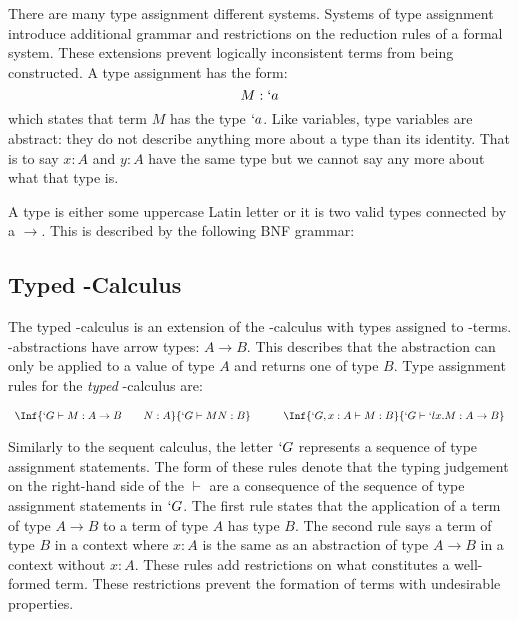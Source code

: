   There are many type assignment different systems.
  Systems of type assignment introduce additional grammar and restrictions on the reduction rules of a formal system. 
  These extensions prevent logically inconsistent terms from being constructed. 
  A type assignment has the form:
  \[
    M : `a 
  \]
  which states that term $M$ has the type $`a$. 
  Like variables, type variables are abstract: 
  they do not describe anything more about a type than its identity. 
  That is to say $x: A$ and $y : A$ have the same type but we cannot say any more about what that type is.
 
  A type is either some uppercase Latin letter or it is two valid types connected by a $\rightarrow$. 
  This is described by the following BNF grammar:
  
  
  \subsection{Typed \lam-Calculus}
  The typed \lam-calculus is an extension of the \lam-calculus with types assigned to \lam-terms.
  \lam-abstractions have arrow types: $A \to B$.
  This describes that the abstraction can only be applied to a value of type $A$ and returns one of type $B$.
  Type assignment rules for the \emph{typed} \lam-calculus are:

  \[
    \begin{array}{c@{\quad\quad\quad}c}
    \Inf{
      `G \vdash M : A \to B \hspace{20pt} N:A 
    }{
      `G \vdash M N : B 
    }
    &
    \Inf{
      `G,x:A \vdash M : B
    }{
      `G \vdash `lx.M : A \to B 
    }
    \vspace{5pt}
    \end{array}
  \]
  Similarly to the sequent calculus, 
  the letter $`G$ represents a sequence of type assignment statements.
  The form of these rules denote that the typing judgement on the right-hand side of the $\vdash$ are a consequence of the sequence of type assignment statements in $`G$.
  The first rule states that the application of a term of type $A \to B$ to
  a term of type $A$ has type $B$. 
  The second rule says a term of type $B$ in a context where $x:A$ is the same as an abstraction of type $A \to B$ in a context without $x:A$. 
  These rules add restrictions on what constitutes a well-formed term.
  These restrictions prevent the formation of terms with undesirable properties.  
  
